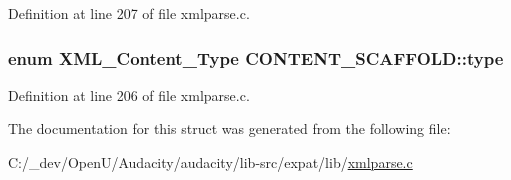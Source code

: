 Definition at line 207 of file xmlparse.\+c.

\subsubsection[{\texorpdfstring{type}{type}}]{\setlength{\rightskip}{0pt plus 5cm}enum {\bf X\+M\+L\+\_\+\+Content\+\_\+\+Type} C\+O\+N\+T\+E\+N\+T\+\_\+\+S\+C\+A\+F\+F\+O\+L\+D\+::type}\hypertarget{struct_c_o_n_t_e_n_t___s_c_a_f_f_o_l_d_a12a51346c37aaeb549fe45205516de59}{}\label{struct_c_o_n_t_e_n_t___s_c_a_f_f_o_l_d_a12a51346c37aaeb549fe45205516de59}


Definition at line 206 of file xmlparse.\+c.



The documentation for this struct was generated from the following file\+:\begin{DoxyCompactItemize}
\item 
C\+:/\+\_\+dev/\+Open\+U/\+Audacity/audacity/lib-\/src/expat/lib/\hyperlink{xmlparse_8c}{xmlparse.\+c}\end{DoxyCompactItemize}
